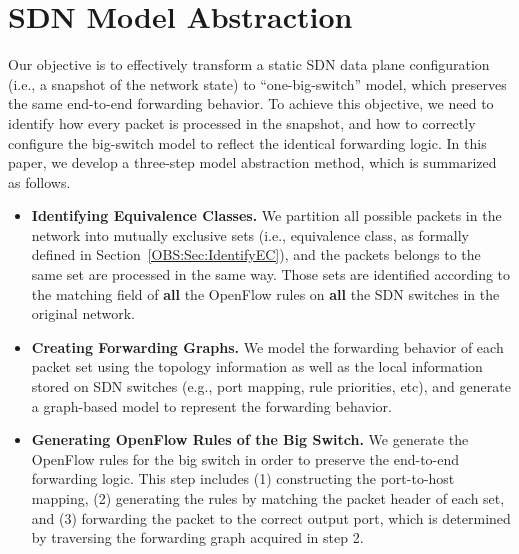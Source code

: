 \section{SDN Model Abstraction}
\label{OBS:Sec:Design}

Our objective is to effectively transform a static SDN data plane configuration (i.e., a snapshot of the network state)
to ``one-big-switch'' model, which preserves the same end-to-end forwarding behavior.
To achieve this objective, we need to identify how every packet is processed in the snapshot,
and how to correctly configure the big-switch model to reflect the identical forwarding logic.
In this paper, we develop a three-step model abstraction method, which is summarized as follows.

\begin{itemize}
    \item \textbf{Identifying Equivalence Classes.} We partition all possible packets in the network into mutually exclusive sets
        (i.e., equivalence class, as formally defined in Section~\ref{OBS:Sec:IdentifyEC}), and the packets belongs to the same set are processed in the same way.
        Those sets are identified according to the matching field of \textbf{all} the OpenFlow rules on \textbf{all} the SDN switches in the original network.
    \item \textbf{Creating Forwarding Graphs.} We model the forwarding behavior of each packet set using the topology information
        as well as the local information stored on SDN switches (e.g., port mapping, rule priorities, etc),
        and generate a graph-based model to represent the forwarding behavior.
    \item \textbf{Generating OpenFlow Rules of the Big Switch.} We generate the OpenFlow rules for the big switch
        in order to preserve the end-to-end forwarding logic.
        This step includes (1) constructing the port-to-host mapping,
        (2) generating the rules by matching the packet header of each set,
        and (3) forwarding the packet to the correct output port, which is determined by traversing the forwarding graph acquired in step 2.
\end{itemize}

